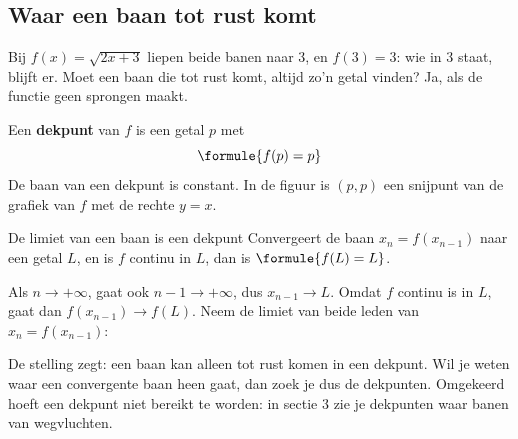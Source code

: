 \subsection{Waar een baan tot rust komt}

Bij $f(x) = \sqrt{2x + 3}$ liepen beide banen naar 3, en $f(3) = 3$: wie in 3 staat, blijft er. Moet een baan die tot rust komt, altijd zo'n getal vinden? Ja, als de functie geen sprongen maakt.

\begin{theorie}
Een \textbf{\textcolor{accent}{dekpunt}} van $f$ is een getal $p$ met
\[
\formule{f(p) = p}
\]
De baan van een dekpunt is constant. In de figuur is $(p, p)$ een snijpunt van de grafiek van $f$ met de rechte $y = x$.

\begin{stelling}{De limiet van een baan is een dekpunt}
Convergeert de baan $x_n = f(x_{n-1})$ naar een getal $L$, en is $f$ continu in $L$, dan is $\formule{f(L) = L}$.
\end{stelling}

\begin{bewijs}
Als $n \to +\infty$, gaat ook $n - 1 \to +\infty$, dus $x_{n-1} \to L$. Omdat $f$ continu is in $L$, gaat dan $f(x_{n-1}) \to f(L)$. Neem de limiet van beide leden van $x_n = f(x_{n-1})$:
\end{bewijs}
\end{theorie}

De stelling zegt: een baan kan alleen tot rust komen in een dekpunt. Wil je weten waar een convergente baan heen gaat, dan zoek je dus de dekpunten. Omgekeerd hoeft een dekpunt niet bereikt te worden: in sectie 3 zie je dekpunten waar banen van wegvluchten.


